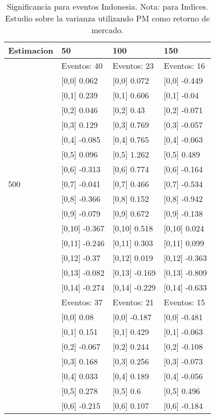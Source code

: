 \begin{table}

\caption{Significancia para eventos Indonesia. Nota: para Indices. Estudio sobre la varianza utilizando PM como retorno de mercado.}
\centering
\begin{tabular}[t]{llll}
\toprule
Estimacion & 50 & 100 & 150\\
\midrule
 & Eventos:  40 & Eventos:  23 & Eventos:  16\\
 & {}[0,0] 0.062 & {}[0,0] 0.072 & {}[0,0] -0.449\\
 & {}[0,1] 0.239 & {}[0,1] 0.606 & {}[0,1] -0.04\\
 & {}[0,2] 0.046 & {}[0,2] 0.43 & {}[0,2] -0.071\\
 & {}[0,3] 0.129 & {}[0,3] 0.769 & {}[0,3] -0.057\\
\addlinespace
 & {}[0,4] -0.085 & {}[0,4] 0.765 & {}[0,4] -0.063\\
 & {}[0,5] 0.096 & {}[0,5] 1.262 & {}[0,5] 0.489\\
 & {}[0,6] -0.313 & {}[0,6] 0.774 & {}[0,6] -0.164\\
500 & {}[0,7] -0.041 & {}[0,7] 0.466 & {}[0,7] -0.534\\
 & {}[0,8] -0.366 & {}[0,8] 0.152 & {}[0,8] -0.942\\
\addlinespace
 & {}[0,9] -0.079 & {}[0,9] 0.672 & {}[0,9] -0.138\\
 & {}[0,10] -0.367 & {}[0,10] 0.518 & {}[0,10] 0.024\\
 & {}[0,11] -0.246 & {}[0,11] 0.303 & {}[0,11] 0.099\\
 & {}[0,12] -0.37 & {}[0,12] 0.019 & {}[0,12] -0.363\\
 & {}[0,13] -0.082 & {}[0,13] -0.169 & {}[0,13] -0.809\\
\addlinespace
 & {}[0,14] -0.274 & {}[0,14] -0.229 & {}[0,14] -0.633\\
 & Eventos:  37 & Eventos:  21 & Eventos:  15\\
 & {}[0,0] 0.08 & {}[0,0] -0.187 & {}[0,0] -0.481\\
 & {}[0,1] 0.151 & {}[0,1] 0.429 & {}[0,1] -0.063\\
 & {}[0,2] -0.067 & {}[0,2] 0.244 & {}[0,2] -0.108\\
\addlinespace
 & {}[0,3] 0.168 & {}[0,3] 0.256 & {}[0,3] -0.073\\
 & {}[0,4] 0.033 & {}[0,4] 0.189 & {}[0,4] -0.056\\
 & {}[0,5] 0.278 & {}[0,5] 0.6 & {}[0,5] 0.496\\
 & {}[0,6] -0.215 & {}[0,6] 0.107 & {}[0,6] -0.184\\

\end{tabular}
\end{table}
